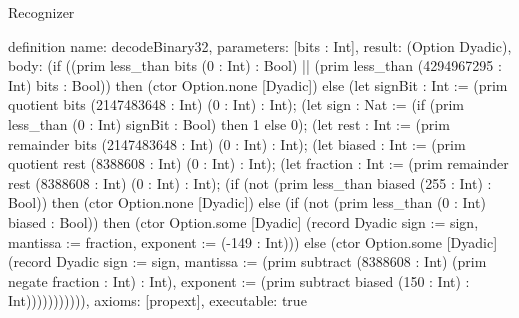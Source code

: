 \begin{lexlean}{Recognizer}
\begin{semanticmodule}
definition{
  name: decodeBinary32,
  parameters: [bits : Int],
  result: (Option Dyadic),
  body: (if ((prim less_than bits (0 : Int) : Bool) || (prim less_than (4294967295 : Int) bits : Bool)) then (ctor Option.none [Dyadic]) else (let signBit : Int := (prim quotient bits (2147483648 : Int) (0 : Int) : Int); (let sign : Nat := (if (prim less_than (0 : Int) signBit : Bool) then 1 else 0); (let rest : Int := (prim remainder bits (2147483648 : Int) (0 : Int) : Int); (let biased : Int := (prim quotient rest (8388608 : Int) (0 : Int) : Int); (let fraction : Int := (prim remainder rest (8388608 : Int) (0 : Int) : Int); (if (not (prim less_than biased (255 : Int) : Bool)) then (ctor Option.none [Dyadic]) else (if (not (prim less_than (0 : Int) biased : Bool)) then (ctor Option.some [Dyadic] (record Dyadic {sign := sign, mantissa := fraction, exponent := (-149 : Int)})) else (ctor Option.some [Dyadic] (record Dyadic {sign := sign, mantissa := (prim subtract (8388608 : Int) (prim negate fraction : Int) : Int), exponent := (prim subtract biased (150 : Int) : Int)})))))))))),
  axioms: [propext],
  executable: true
}


\end{semanticmodule}
\end{lexlean}

